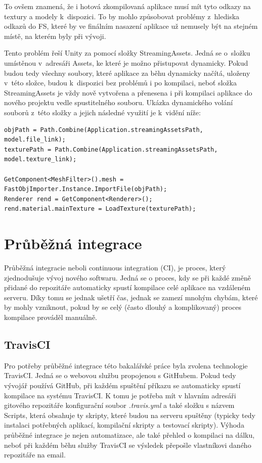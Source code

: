 \documentclass[thesis=B,czech]{FITthesis}[2012/06/26]
\begin{document}
To ovšem znamená, že i hotová zkompilovaná aplikace musí mít tyto odkazy na textury a modely k~dispozici. To by mohlo způsobovat problémy z~hlediska odkazů do FS, které by ve finálním nasazení aplikace už nemusely být na stejném místě, na kterém byly při vývoji.

Tento problém řeší Unity za pomocí složky StreamingAssets. Jedná se o~složku umístěnou v~adresáři Assets, ke které je možno přistupovat dynamicky. Pokud budou tedy všechny soubory, které aplikace za běhu dynamicky načítá, uloženy v~této složce, budou k~dispozici bez problémů i po kompilaci, neboť složka StreamingAssets je vždy nově vytvořena a přenesena i při kompilaci aplikace do nového projektu vedle spustitelného souboru. Ukázka dynamického volání souborů z~této složky a jejich následné využití je k~vidění níže:

\begin{lstlisting}[frame=single]
objPath = Path.Combine(Application.streamingAssetsPath, model.file_link);
texturePath = Path.Combine(Application.streamingAssetsPath, model.texture_link);

GetComponent<MeshFilter>().mesh = FastObjImporter.Instance.ImportFile(objPath);
Renderer rend = GetComponent<Renderer>();
rend.material.mainTexture = LoadTexture(texturePath);
\end{lstlisting}


	\section{Průběžná integrace}
	Průběžná integracie neboli continuous integration (CI), je proces, který zjednodušuje vývoj nového softwaru. Jedná se o proces, kdy se při každé změně přidané do repozitáře automaticky spustí kompilace celé aplikace na vzdáleném serveru. Díky tomu se jednak ušetří čas, jednak se zamezí mnohým chybám, které by mohly vzniknout, pokud by se celý (často dlouhý a komplikovaný) proces kompilace prováděl manuálně.
	
	\subsection{TravisCI}
Pro potřeby průběžné integrace této bakalářské práce byla zvolena technologie TravisCI. Jedná se o webovou službu propojenou s GitHubem. Pokud tedy vývojář používá GitHub, při každém spuštění příkazu  se automaticky spustí kompilace na systému TravisCI. K tomu je potřeba mít v hlavním adresáři gitového repozitáře konfigurační soubor \emph{.travis.yml} a také složku s názvem Scripts, která obsahuje ty skripty, které budou na serveru spuštěny (typicky tedy instalaci potřebných aplikací, kompilační skripty a testovací skripty). Výhoda průběžné integrace je nejen automatizace, ale také přehled o kompilaci na dálku, neboť při každém běhu služby TravisCI se výsledek přepošle vlastníkovi daného repozitáře na email.
\end{document}
